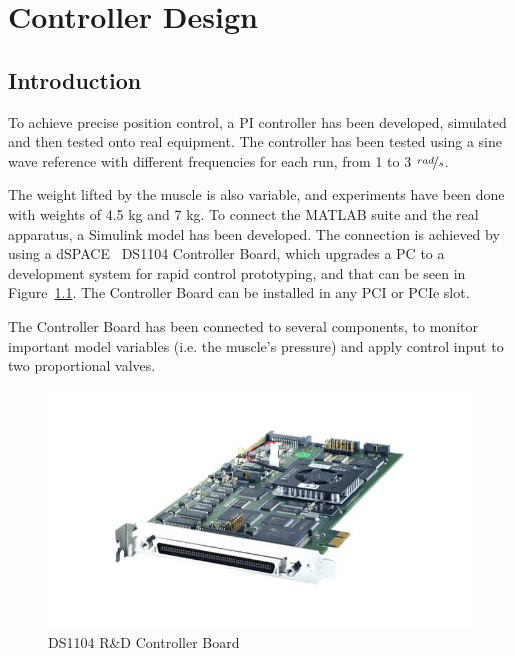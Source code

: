 
\chapter{Controller Design}
\label{ch:control} 

\section{Introduction}
\label{sec:6.intro}

To achieve precise position control, a PI controller has been developed,
simulated and then tested onto real equipment. The controller has been tested
using a sine wave reference with different frequencies for each run,
from 1 to 3 $\nicefrac{rad}{s}$.

The weight lifted by the muscle is also variable,
and experiments have been done with weights of 4.5 kg and 7 kg.
To connect the MATLAB suite and the real apparatus,
a Simulink model has been developed. The connection is achieved
by using a dSPACE~\cite{dspace} DS1104 Controller Board,
which upgrades a PC to a development system for rapid control prototyping,
and that can be seen in Figure~\ref{fig:dspace}.
The Controller Board can be installed in any PCI or PCIe slot.

The Controller Board has been connected to several components,
to monitor important model variables (i.e. the muscle's pressure)
and apply control input to two proportional valves.

\begin{figure}[H]
	\centering
	\includegraphics[width=\linewidth]{Images/dspace}
	\caption{DS1104 R\&D Controller Board}
	\label{fig:dspace}
\end{figure}

